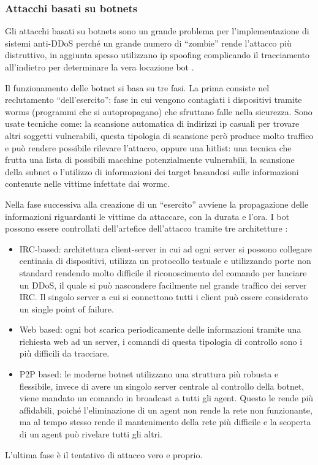 \subsubsection{Attacchi basati su botnets}

Gli attacchi basati su botnets sono un grande problema per l'implementazione di sistemi anti-DDoS perché un grande numero di ``zombie'' rende l'attacco più distruttivo, in aggiunta spesso utilizzano ip spoofing complicando il tracciamento all'indietro per determinare la vera locazione bot \cite{ddos_survey_1}.

Il funzionamento delle botnet si basa su tre fasi. La prima consiste nel reclutamento ``dell'esercito'': fase in cui vengono contagiati i dispositivi tramite worms (programmi che si autopropagano) che sfruttano falle nella sicurezza. Sono usate tecniche come: la scansione automatica di indirizzi ip casuali per trovare altri soggetti vulnerabili, questa tipologia di scansione però produce molto traffico e può rendere possibile rilevare l'attacco, oppure una hitlist: una tecnica che frutta una lista di possibili macchine potenzialmente vulnerabili, la scansione della subnet o l'utilizzo di informazioni dei target basandosi sulle informazioni contenute nelle vittime infettate dai wormc.


Nella fase successiva alla creazione di un ``esercito'' avviene la propagazione delle informazioni riguardanti le vittime da attaccare, con la durata e l'ora.
I bot possono essere controllati dell'artefice dell'attacco tramite tre architetture \cite{ddos_survey_4}: %
\begin{itemize}
    \item IRC-based: architettura client-server in cui ad ogni server si possono collegare centinaia di dispositivi, utilizza un protocollo testuale e utilizzando porte non standard rendendo molto difficile il riconoscimento del comando per lanciare un DDoS, il quale si può nascondere facilmente nel grande traffico dei server IRC. Il singolo server a cui si connettono tutti i client può essere considerato un single point of failure.
    \item Web based: ogni bot scarica periodicamente delle informazioni tramite una richiesta web ad un server, i comandi di questa tipologia di controllo sono i più difficili da tracciare.
    \item P2P based: le moderne botnet utilizzano una struttura più robusta e flessibile, invece di avere un singolo server centrale al controllo della botnet, viene mandato un comando in broadcast a tutti gli agent. Questo le rende più affidabili, poiché l'eliminazione di un agent non rende la rete non funzionante, ma al tempo stesso rende il mantenimento della rete più difficile e la scoperta di un agent può rivelare tutti gli altri. 
\end{itemize}
L'ultima fase è il tentativo di attacco vero e proprio.

